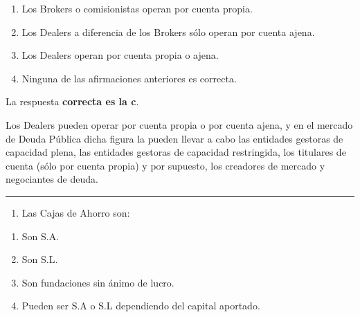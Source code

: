 \documentclass[
  letterpaper,
  DIV=11,
  numbers=noendperiod]{scrreprt}
\providecommand{\tightlist}{%
  \setlength{\itemsep}{0pt}\setlength{\parskip}{0pt}}\usepackage{longtable,booktabs,array}
\begin{document}
\begin{enumerate}
\def\labelenumi{\alph{enumi})}
\item
  Los Brokers o comisionistas operan por cuenta propia.
\item
  Los Dealers a diferencia de los Brokers sólo operan por cuenta ajena.
\item
  Los Dealers operan por cuenta propia o ajena.
\item
  Ninguna de las afirmaciones anteriores es correcta.
\end{enumerate}

\begin{tcolorbox}[enhanced jigsaw, left=2mm, opacityback=0, colback=white, breakable, arc=.35mm, bottomrule=.15mm, rightrule=.15mm, toprule=.15mm, leftrule=.75mm, colframe=quarto-callout-tip-color-frame]
\begin{minipage}[t]{5.5mm}
\textcolor{quarto-callout-tip-color}{\faLightbulb}
\end{minipage}%
\begin{minipage}[t]{\textwidth - 5.5mm}

La respuesta \textbf{correcta es la c}.

Los Dealers pueden operar por cuenta propia o por cuenta ajena, y en el
mercado de Deuda Pública dicha figura la pueden llevar a cabo las
entidades gestoras de capacidad plena, las entidades gestoras de
capacidad restringida, los titulares de cuenta (sólo por cuenta propia)
y por supuesto, los creadores de mercado y negociantes de deuda.

\end{minipage}%
\end{tcolorbox}

\begin{center}\rule{0.5\linewidth}{0.5pt}\end{center}

\begin{enumerate}
\def\labelenumi{\arabic{enumi}.}
\setcounter{enumi}{15}
\tightlist
\item
  Las Cajas de Ahorro son:
\end{enumerate}

\begin{enumerate}
\def\labelenumi{\alph{enumi})}
\item
  Son S.A.
\item
  Son S.L.
\item
  Son fundaciones sin ánimo de lucro.
\item
  Pueden ser S.A o S.L dependiendo del capital aportado.
\end{enumerate}
\end{document}

